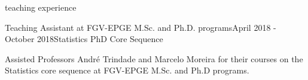 \documentclass{resume} %
\begin{document}
\begin{rSection}{teaching experience}
\begin{rSubsection}{Teaching Assistant at FGV-EPGE M.Sc. and Ph.D. programs}{April 2018 - October 2018}{Statistics PhD Core Sequence}{}
\item Assisted Professors André Trindade and Marcelo Moreira for their courses on the Statistics core sequence at FGV-EPGE M.Sc. and Ph.D programs.
\end{rSubsection}


\end{rSection}
\end{document}

